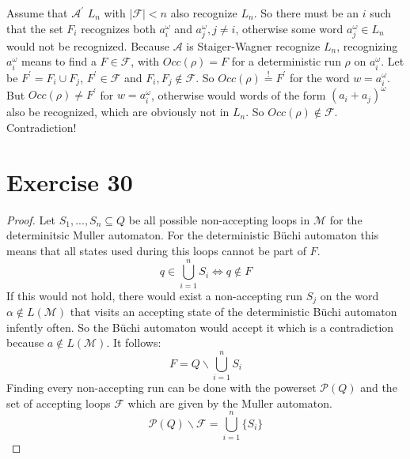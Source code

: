 \documentclass[10pt]{article}
\begin{document}
  Assume that $\mathcal{A}^\prime$ $L_n$ with $\vert
  \mathcal{F}\vert  < n$ also recognize $L_n$. So there must be an $i$ such
  that the set $F_i$ recognizes both $a_i^{\omega}$ and $a_j^{\omega},j\neq i$,
  otherwise some word $a_j^\omega \in L_n$ would not be recognized.
  Because $\mathcal{A}$ is Staiger-Wagner recognize $L_n$, recognizing
  $a_i^\omega$ means to find a $F\in \mathcal{F}$, with $Occ(\rho)=F$ for a
  deterministic run $\rho$ on $a_i^\omega$. Let be $F^\prime =F_i\cup F_j$,
  $F^\prime \in \mathcal{F}$ and $F_i,F_j\not\in \mathcal{F}$. So
  $Occ(\rho)\overset{!}{=}F^\prime$ for the word $w=a_i^\omega$. But
  $Occ(\rho)\neq F^\prime$ for $w=a_i^\omega$, otherwise would words of the form
  $(a_i+a_j)^\omega$ also
  be recognized, which are obviously not in $L_n$. So $Occ(\rho)\not\in
  \mathcal{F}$. Contradiction!
  
\section*{Exercise 30}
  \begin{proof}
    Let $S_1,...,S_n\subseteq Q$ be all possible non-accepting loops in
    $\mathcal{M}$ for the determinitsic Muller automaton. For the 
    deterministic Büchi automaton this means that all
    states used during this loops cannot be part of $F$.
    \begin{displaymath}
      q\in \bigcup\limits_{i=1}^{n} S_i \Leftrightarrow q\not\in F
    \end{displaymath}
    If this would not hold, there would exist a non-accepting run $S_j$ on the
    word $\alpha\not\in L(\mathcal{M})$ that
    visits an accepting state of the deterministic Büchi automaton infently
    often. So the Büchi automaton would accept it which is a contradiction
    because $a\not\in L(\mathcal{M})$. It follows:
    \begin{displaymath}
      F = Q \backslash \bigcup\limits_{i=1}^{n} S_i
    \end{displaymath}
    Finding every non-accepting run can be done with the powerset $\mathcal{P}(Q)$
    and the set of accepting loops $\mathcal{F}$ which are given by the Muller
    automaton.
    \begin{displaymath}
      \mathcal{P}(Q)\backslash \mathcal{F} = \bigcup\limits_{i=1}^{n} \{S_i\}
    \end{displaymath}
  \end{proof}
    
\end{document}
